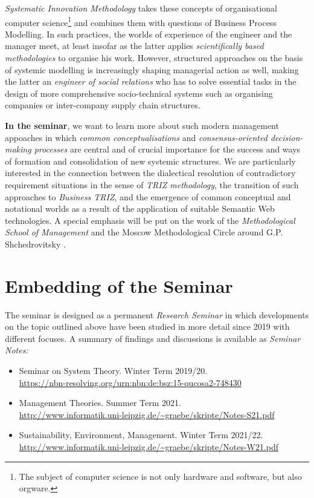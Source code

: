 \documentclass[11pt,a4paper]{article}
\begin{document}
\emph{Systematic Innovation Methodology} takes these concepts of
organisational computer science\footnote{The subject of computer science is
  not only hardware and software, but also orgware.} and combines them with
questions of Business Process Modelling. In such practices, the worlds of
experience of the engineer and the manager meet, at least insofar as the
latter applies \emph{scientifically based methodologies} to organise his work.
However, structured approaches on the basis of systemic modelling is
increasingly shaping managerial action as well, making the latter an
\emph{engineer of social relations} who has to solve essential tasks in the
design of more comprehensive socio-technical systems such as organising
companies or inter-company supply chain structures.

\textbf{In the seminar}, we want to learn more about such modern management
appoaches in which \emph{common conceptualisations} and
\emph{consensus-oriented decision-making processes} are central and of crucial
importance for the success and ways of formation and consolidation of new
systemic structures.  We are particularly interested in the connection between
the dialectical resolution of contradictory requirement situations in the
sense of \emph{TRIZ methodology}, the transition of such approaches to
\emph{Business TRIZ}, and the emergence of common conceptual and notational
worlds as a result of the application of suitable Semantic Web technologies.
A special emphasis will be put on the work of the \emph{Methodological School
  of Management} and the Moscow Methodological Circle around
G.P. Shchedrovitsky \cite{MSM}.

\section{Embedding of the Seminar}

The seminar is designed as a permanent \emph{Research Seminar} in which
developments on the topic outlined above have been studied in more detail
since 2019 with different focuses. A summary of findings and discussions is
available as \emph{Seminar Notes:}
\begin{itemize}
\item Seminar on System Theory. Winter Term 2019/20.\\
  \url{https://nbn-resolving.org/urn:nbn:de:bsz:15-qucosa2-748430} 
\item Management Theories. Summer Term 2021.\\
  \url{http://www.informatik.uni-leipzig.de/~graebe/skripte/Notes-S21.pdf}
\item Sustainability, Environment, Management. Winter Term 2021/22.\\
  \url{http://www.informatik.uni-leipzig.de/~graebe/skripte/Notes-W21.pdf}
\end{itemize}
\end{document}
